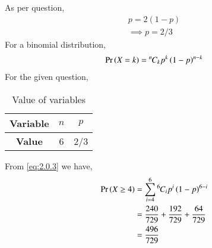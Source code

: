 

As per question,
\begin{align}
    p=2(1-p) \label{eq:2.0.1}\\
    \implies p=2/3\label{eq:2.0.2}
    \end{align}
For a binomial distribution,
\begin {align}
    \Pr\left(X=k\right)= {{}^{n}\mkern-1muC_{k}} p^k \left(1-p\right)^{n-k}\label{eq:2.0.3}
    \end{align}
For the given question,
\begin{table}[h]
\begin{center}
\begin{tabular}{|c|c|c|}
\hline
 \textbf{Variable} & $n$ & $p$\\
 \hline
 \textbf{Value} & 6 & 2/3\\
 \hline
\end{tabular}
\caption{Value of variables}
\label{Tab 1}
\end{center}
\end{table}
From \eqref{eq:2.0.3} we have,
\begin{align}
\Pr\left(X\geq4\right)&=\sum_{i=4}^{6}{{}^{6}\mkern-1muC_{i}} p^i\left(1-p\right)^{6-i}
\label{eq: 2.0.4}\\
&=\frac{240}{729}+\frac{192}{729}+\frac{64}{729}
\label{eq: 2.0.5}\\
&=\frac{496}{729}
\label{eq:2.0.6}
\end{align}